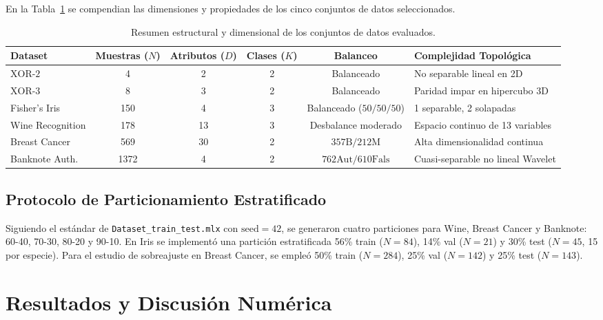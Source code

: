 \documentclass{article}
\begin{document}
En la Tabla~\ref{tab:resumen_datasets} se compendian las dimensiones y propiedades de los cinco conjuntos de datos seleccionados.

\begin{table}[H]
\centering
\small
\caption{Resumen estructural y dimensional de los conjuntos de datos evaluados.}
\label{tab:resumen_datasets}
\begin{tabularx}{\textwidth}{l c c c c l}
\toprule
\textbf{Dataset} & \textbf{Muestras ($N$)} & \textbf{Atributos ($D$)} & \textbf{Clases ($K$)} & \textbf{Balanceo} & \textbf{Complejidad Topológica} \\
\midrule
$\text{XOR-2}$ & 4 & 2 & 2 & Balanceado & No separable lineal en 2D \\
$\text{XOR-3}$ & 8 & 3 & 2 & Balanceado & Paridad impar en hipercubo 3D \\
Fisher's Iris & 150 & 4 & 3 & Balanceado ($50/50/50$) & 1 separable, 2 solapadas \\
Wine Recognition & 178 & 13 & 3 & Desbalance moderado & Espacio continuo de 13 variables \\
Breast Cancer & 569 & 30 & 2 & $357\text{B} / 212\text{M}$ & Alta dimensionalidad continua \\
Banknote Auth. & 1372 & 4 & 2 & $762\text{Aut} / 610\text{Fals}$ & Cuasi-separable no lineal Wavelet \\
\bottomrule
\end{tabularx}
\end{table}

\subsection{Protocolo de Particionamiento Estratificado}

Siguiendo el estándar de \texttt{Dataset\_train\_test.mlx} con $\text{seed}=42$, se generaron cuatro particiones para Wine, Breast Cancer y Banknote: 60-40, 70-30, 80-20 y 90-10. En Iris se implementó una partición estratificada 56\% train ($N=84$), 14\% val ($N=21$) y 30\% test ($N=45$, 15 por especie). Para el estudio de sobreajuste en Breast Cancer, se empleó 50\% train ($N=284$), 25\% val ($N=142$) y 25\% test ($N=143$).

\section{Resultados y Discusión Numérica}
\label{sec:resultados}
\end{document}
